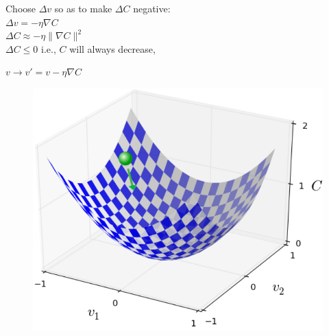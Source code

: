 \documentclass[10pt, compress]{beamer}
\begin{document}
\begin{frame}
  \begin{multicols}{2}
    Choose $\Delta v$ so as to make $\Delta C$ negative: \\

    $\Delta v = -\eta \nabla C$ \\
    $\Delta C \approx - \eta \| \nabla C \| ^2$ \\
    $\Delta C \leq 0$ i.e., $C$ will always decrease,

    $ v \rightarrow v' = v - \eta \nabla C$

  \columnbreak

    \begin{figure}
      \includegraphics[width=1\linewidth]{imgs/gd_2}
    \end{figure}
  \end{multicols}
\end{frame}
\end{document}
